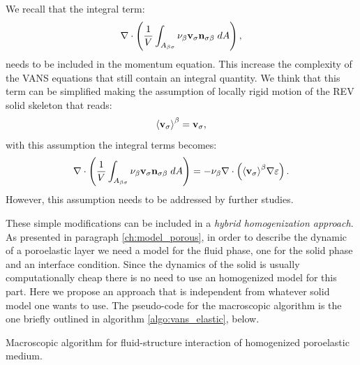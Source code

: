 We recall that the integral term: $$\nabla \cdot \left( \dfrac{1}{V} \displaystyle\int_{A_{\beta \sigma}}  \nu_{\beta} \textbf{v}_{\sigma} \mathbf{n}_{\sigma \beta} \;dA \right),$$ needs to be included in the momentum equation. This increase the complexity of the VANS equations that still contain an integral quantity. We think that this term can be simplified making the assumption of locally rigid motion of the REV solid skeleton that reads:
$$
{\left< \textbf{v}_{\sigma} \right>}^{\beta} = \textbf{v}_{\sigma},
$$
\noindent with this assumption the integral terms becomes:
$$
\nabla \cdot \left( \dfrac{1}{V} \displaystyle\int_{A_{\beta \sigma}}  \nu_{\beta} \textbf{v}_{\sigma} \mathbf{n}_{\sigma \beta} \;dA \right) = - \nu_{\beta} \nabla \cdot \left( {\left< \textbf{v}_{\sigma} \right>}^{\beta} \nabla \varepsilon \right).
$$
However, this assumption needs to be addressed by further studies.

These simple modifications can be included in a \textit{hybrid homogenization approach}. As presented in paragraph \ref{ch:model_porous}, in order to describe the dynamic of a poroelastic layer we need a model for the fluid phase, one for the solid phase and an interface condition. Since the dynamics of the solid is usually computationally cheap there is no need to use an homogenized model for this part. Here we propose an approach that is independent from whatever solid model one wants to use. The pseudo-code for the macroscopic algorithm is the one briefly outlined in algorithm  \ref{algo:vans_elastic}, below.
\vspace{0.5cm}

\begin{algorithm}[H]
	\caption{Macroscopic algorithm for fluid-structure interaction of homogenized poroelastic medium.}
	\label{algo:vans_elastic}
\end{algorithm}

